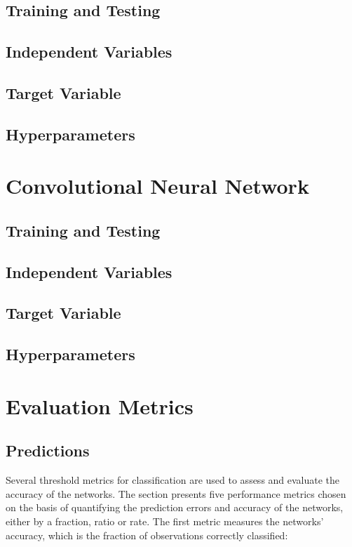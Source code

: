 \subsection{Training and Testing}

\subsection{Independent Variables}

\subsection{Target Variable}

\subsection{Hyperparameters}

\section{Convolutional Neural Network}

\subsection{Training and Testing}

\subsection{Independent Variables}

\subsection{Target Variable}

\subsection{Hyperparameters}

\section{Evaluation Metrics}
\subsection{Predictions}
Several threshold metrics for classification are used to assess and evaluate the accuracy of the networks. The section presents five performance metrics chosen on the basis of quantifying the prediction errors and accuracy of the networks, either by a fraction, ratio or rate. The first metric measures the networks' accuracy, which is the fraction of observations correctly classified:


